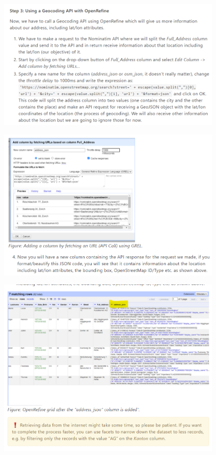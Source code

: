 \begin{figure}[H]
    \includegraphics[width=\linewidth]{./Figures/Appendices/worksheet/44.png}
\end{figure}
\begin{figure}[H]
    \includegraphics[width=\linewidth]{./Figures/Appendices/worksheet/45.png}
\end{figure}
\begin{figure}[H]
    \includegraphics[width=\linewidth]{./Figures/Appendices/worksheet/46.png}
\end{figure}
